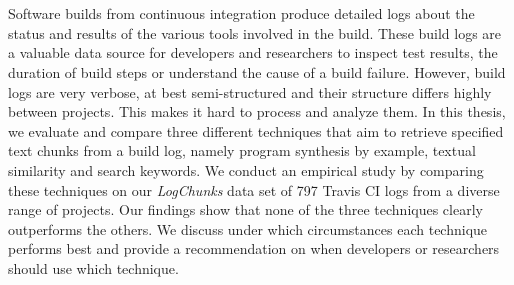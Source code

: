 \documentclass[\myrootdir/main.tex]{subfiles}
\begin{document}
\chapter*{\myAbstractTitle}

Software builds from continuous integration produce detailed logs about the status and results of the various tools involved in the build.
These build logs are a valuable data source for developers and researchers to inspect test results, the duration of build steps or understand the cause of a build failure.
However, build logs are very verbose, at best semi-structured and their structure differs highly between projects.
This makes it hard to process and analyze them.
In this thesis, we evaluate and compare three different techniques that aim to retrieve specified text chunks from a build log, namely program synthesis by example, textual similarity and search keywords.
We conduct an empirical study by comparing these techniques on our \emph{LogChunks} data set of 797 Travis CI logs from a diverse range of projects.
Our findings show that none of the three techniques clearly outperforms the others.
We discuss under which circumstances each technique performs best and provide a recommendation on when developers or researchers should use which technique.
\end{document}
